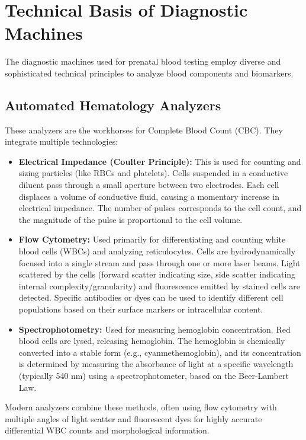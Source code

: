 \documentclass{article}
\begin{document}
\section{Technical Basis of Diagnostic Machines}

The diagnostic machines used for prenatal blood testing employ diverse and sophisticated technical principles to analyze blood components and biomarkers.

\subsection{Automated Hematology Analyzers}
These analyzers are the workhorses for Complete Blood Count (CBC). They integrate multiple technologies:
\begin{itemize}
    \item \textbf{Electrical Impedance (Coulter Principle):} This is used for counting and sizing particles (like RBCs and platelets). Cells suspended in a conductive diluent pass through a small aperture between two electrodes. Each cell displaces a volume of conductive fluid, causing a momentary increase in electrical impedance. The number of pulses corresponds to the cell count, and the magnitude of the pulse is proportional to the cell volume.
    \item \textbf{Flow Cytometry:} Used primarily for differentiating and counting white blood cells (WBCs) and analyzing reticulocytes. Cells are hydrodynamically focused into a single stream and pass through one or more laser beams. Light scattered by the cells (forward scatter indicating size, side scatter indicating internal complexity/granularity) and fluorescence emitted by stained cells are detected. Specific antibodies or dyes can be used to identify different cell populations based on their surface markers or intracellular content.
    \item \textbf{Spectrophotometry:} Used for measuring hemoglobin concentration. Red blood cells are lysed, releasing hemoglobin. The hemoglobin is chemically converted into a stable form (e.g., cyanmethemoglobin), and its concentration is determined by measuring the absorbance of light at a specific wavelength (typically 540 nm) using a spectrophotometer, based on the Beer-Lambert Law.
\end{itemize}
Modern analyzers combine these methods, often using flow cytometry with multiple angles of light scatter and fluorescent dyes for highly accurate differential WBC counts and morphological information.
\end{document}
